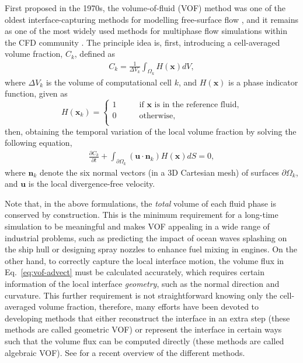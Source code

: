 First proposed in the 1970s, the volume-of-fluid (VOF) method was one of the oldest interface-capturing methods for modelling free-surface flow \citep{Debar1974, hirt_nichols_1975, hirt_nichols_1981a}, and it remains as one of the most widely used methods for multiphase flow simulations within the CFD community \citep{Scardovelli_Zaleski_1999, gerris, pilliod_puckett_2004, xiao_honma_kono_2005a, mthinc2012, paris2019}.
The principle idea is, first, introducing a cell-averaged volume fraction, $C_{k}$, defined as
\begin{equation}
 \begin{aligned}
   C_{k} = \frac{1}{\Delta V_k} \int_{\Omega_k} H(\bm{x}) dV,
 \end{aligned}
\end{equation}
where $\Delta V_k$ is the volume of computational cell $k$, and $H(\bm{x})$ is a phase indicator function, given as
\begin{equation}
    H(\bm{x}_k)=
    \begin{cases}
        1 \quad \quad & \textrm{if $\bm{x}$ is in the reference fluid,} \\
        0 \quad & \textrm{otherwise}, \\
    \end{cases}
\end{equation}
then, obtaining the temporal variation of the local volume fraction by solving the following equation,
\begin{equation} \label{eq:vof-advect}
 \begin{aligned}
   \frac{\partial C_{k}}{\partial t} + \int_{\partial \Omega_k} (\bm{u \cdot n}_k) H(\bm{x}) dS =0,
 \end{aligned}
\end{equation}
where $\bm{n}_k$ denote the six normal vectors (in a 3D Cartesian mesh) of surfaces $\partial \Omega_k$, and $\bm u$ is the local divergence-free velocity.

Note that, in the above formulations, the \emph{total} volume of each fluid phase is conserved by construction.
This is the minimum requirement for a long-time simulation to be meaningful and makes VOF appealing in a wide range of industrial problems, such as predicting the impact of ocean waves splashing on the ship hull or designing spray nozzles to enhance fuel mixing in engines.
On the other hand, to correctly capture the local interface motion, the volume flux in Eq.\ \eqref{eq:vof-advect} must be calculated accurately, which requires certain information of the local interface \emph{geometry}, such as the normal direction and curvature.
This further requirement is not straightforward knowing only the cell-averaged volume fraction, therefore, many efforts have been devoted to developing methods that either reconstruct the interface in an extra step (these methods are called geometric VOF) or represent the interface in certain ways such that the volume flux can be computed directly (these methods are called algebraic VOF). See \cite{mirjalili_jain_dodd_2017a} for a recent overview of the different methods.

